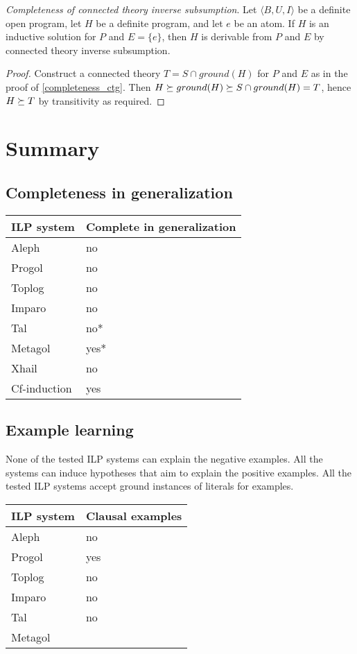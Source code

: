\begin{thm}
\emph{Completeness of connected theory inverse subsumption}.
\label{completeness_ctis}
Let $\langle B, U, I \rangle$ be a definite open program,
let $H$ be a definite program, and let $e$ be an atom.
If $H$ is an inductive solution for $P$ and
$E = \{e\}$, then $H$ is derivable from $P$ and $E$ by connected theory inverse subsumption.
\end{thm}
\begin{proof}
Construct a connected theory $T=S \cap ground(H)$ for $P$ and $E$ as in the proof of \ref{completeness_ctg}.
Then $H \succeq ground(H) \succeq S \cap ground(H) = T$,
hence $H \succeq T$ by transitivity as required.
\end{proof}

\section{Summary}

\subsection{Completeness in generalization\cite{yamamoto2012inverse}}
\begin{center}
    \begin{tabular}{ | l | p{5cm} |}
    \hline
    ILP system &  Complete in generalization \\ \hline
    Aleph & no\\ \hline
    Progol & no\\ \hline
    Toplog & no\\ \hline
    Imparo & no\\ \hline
    Tal & no*\\ \hline
    Metagol & yes*\\ \hline
    Xhail & no\\ \hline
    Cf-induction & yes\\
    \hline
    \end{tabular}
\end{center}


\subsection{Example learning}
None of the tested ILP systems can explain the negative examples. All the systems can induce hypotheses that aim to explain the positive examples. All the tested ILP systems accept ground instances of literals for examples.
\begin{center}
    \begin{tabular}{ | l | p{5cm} |}
    \hline
    ILP system &  Clausal examples \\ \hline
    Aleph & no\\ \hline
    Progol & yes\\ \hline
    Toplog & no\\ \hline
    Imparo & no\\ \hline
    Tal & no\\ \hline
    Metagol & \\ \hline
    \hline
    \end{tabular}
\end{center}

